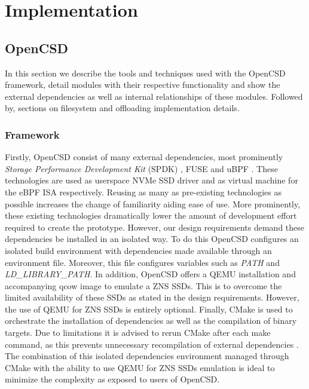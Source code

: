 
\chapter{Implementation} %

\section{OpenCSD}

In this section we describe the tools and techniques used with the OpenCSD
framework, detail modules with their respective functionality and show the
external dependencies as well as internal relationships of these modules. 
Followed by, sections on filesystem and offloading implementation details.

\subsection{Framework}

Firstly, OpenCSD consist of many external dependencies, most prominently
\textit{Storage Performance Development Kit} (SPDK) \cite{spdk},
FUSE \cite{fuse} and uBPF \cite{ubpf}. These technologies are used as userspace
NVMe SSD driver and as virtual machine for the eBPF ISA respectively. Reusing as
many as pre-existing technologies as possible increases the change of
familiarity aiding ease of use. More prominently, these existing technologies
dramatically lower the amount of development effort required to create the
prototype. However, our design requirements demand these dependencies be
installed in an isolated way. To do this OpenCSD configures an isolated build
environment with dependencies made available through an environment file.
Moreover, this file configures variables such as \textit{PATH} and
\textit{LD\_LIBRARY\_PATH}. In addition, OpenCSD offers a QEMU installation and
accompanying qcow image to emulate a ZNS SSDs. This is to overcome the limited
availability of these SSDs as stated in the design requirements. However, the
use of QEMU for ZNS SSDs is entirely optional. Finally, CMake \cite{cmake} is
used to orchestrate the installation of dependencies as well as the compilation
of binary targets. Due to limitations it is advised to rerun CMake after each
make command, as this  prevents unnecessary recompilation of external
dependencies \footnotemark[11]. The combination of this isolated dependencies
environment managed through CMake with the ability to use QEMU for ZNS SSDs
emulation is ideal to minimize the complexity as exposed to users of OpenCSD.

